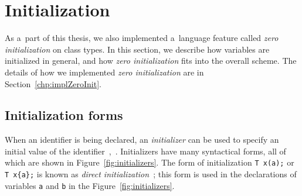 \documentclass[nolot,nolof,nocover,printed]{fithesis3}
\newcommand{\stdN}[2]{\cite[#2]{#1}\xspace}
\begin{document}
%
%
%
%


\section{Initialization} \label{chap:lang:init}
As a~part of this thesis, we also implemented a~language feature called \textit{zero initialization} on class types. In this section, we describe how variables are initialized in general, and how \textit{zero initialization} fits into the overall scheme. The details of how we implemented \textit{zero initialization} are in Section~\ref{chp:implZeroInit}.

\subsection{Initialization forms}
When an identifier is being declared, an \textit{initializer} can be used to specify an initial value of the identifier~\stdN{n4296}{\S 8.5/1},~\stdN{n4700}{\S 11.6/1}. Initializers have many syntactical forms, all of which are shown in Figure~\ref{fig:initializers}. The form of initialization \lstinline|T x(a);| or \lstinline|T x{a};| is known as \textit{direct initialization}~\stdN{n4296}{\S 8.5/16}; this form is used in the declarations of variables \lstinline|a| and \lstinline|b| in the Figure~\ref{fig:initializers}.
\end{document}

